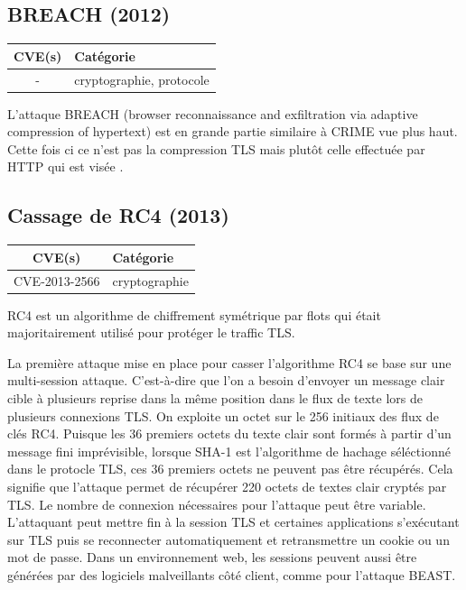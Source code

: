 \subsection{BREACH (2012)}

\begin{tabularx}{0.96\textwidth}{|c|X|}
  \hline
  \textbf{CVE(s)} & \textbf{Catégorie} \\
  \hline
  - & cryptographie, protocole \\
  \hline
\end{tabularx}

\vspace{1em}


L'attaque BREACH (browser reconnaissance and exfiltration via adaptive compression of hypertext) est en grande partie similaire à CRIME vue plus haut. Cette fois ci ce n'est pas la compression TLS mais plutôt celle effectuée par HTTP qui est visée \cite{breach}.




\subsection{Cassage de RC4 (2013)}

\begin{tabularx}{0.96\textwidth}{|c|X|}
  \hline
  \textbf{CVE(s)} & \textbf{Catégorie} \\
  \hline
  CVE-2013-2566 & cryptographie \\
  \hline
\end{tabularx}

\vspace{1em}


RC4 est un algorithme de chiffrement symétrique par flots qui était majoritairement utilisé pour protéger le traffic TLS.

La première attaque mise en place pour casser l'algorithme RC4 se base sur une multi-session attaque. C'est-à-dire que l'on a besoin d'envoyer un message clair cible à plusieurs reprise dans la même position dans le flux de texte lors de plusieurs connexions TLS. On exploite un octet sur le 256 initiaux des flux de clés RC4. Puisque les 36 premiers octets du texte clair sont formés à partir d'un message fini imprévisible, lorsque SHA-1 est l'algorithme de hachage séléctionné dans le protocle TLS, ces 36 premiers octets ne peuvent pas être récupérés. Cela signifie que l'attaque permet de récupérer 220 octets de textes clair cryptés par TLS. Le nombre de connexion nécessaires pour l'attaque peut être variable. L'attaquant peut mettre fin à la session TLS et certaines applications s'exécutant sur TLS puis se reconnecter automatiquement et retransmettre un cookie ou un mot de passe. Dans un environnement web, les sessions peuvent aussi être générées par des logiciels malveillants côté client, comme pour l'attaque BEAST.

